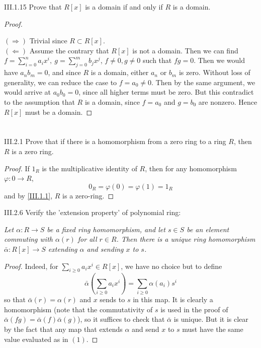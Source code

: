 \begin{problem}{III.1.15}
Prove that $R[x]$ is a domain if and only if $R$ is a domain.
\end{problem}
\begin{proof} \

\noindent $(\Rightarrow)$ Trivial since $R \subset R[x]$. \\
$(\Leftarrow)$ Assume the contrary that $R[x]$ is not a domain. Then we can find $f = \sum_{i=0}^n a_ix^i, \: g = \sum_{j=0}^m b_jx^j$, $f \neq 0, g \neq 0$ such that $fg = 0$. Then we would have $a_nb_m = 0$, and since $R$ is a domain, either $a_n$ or $b_m$ is zero. Without loss of generality, we can reduce the case to $f = a_0 \neq 0$. Then by the same argument, we would arrive at $a_0b_0 = 0$, since all higher terms must be zero. But this contradict to the assumption that $R$ is a domain, since $f = a_0$ and $g = b_0$ are nonzero. Hence $R[x]$ must be a domain.
\end{proof}

\section{}
\begin{problem}{III.2.1}
Prove that if there is a homomorphism from a zero ring to a ring $R$, then $R$ is a zero ring.
\end{problem}
\begin{proof}
If $1_R$ is the multiplicative identity of $R$, then for any homomorphism $\varphi : 0 \to R$, 
\[
0_R = \varphi(0) = \varphi(1) = 1_R
\]
and by \ref{III.1.1}, $R$ is a zero-ring.
\end{proof}

\begin{problem}{III.2.6}
Verify the 'extension property' of polynomial ring:

\textit{
Let $\alpha : R \to S$ be a fixed ring homomorphism, and let $s \in S$ be an element commuting with $\alpha(r)$ for all $r \in R$. Then there is a unique ring homomorphism $\bar{\alpha} : R[x] \to S$ extending $\alpha$ and sending $x$ to $s$.
}
\end{problem}
\begin{proof}
Indeed, for $\sum_{i \geq 0} a_ix^i \in R[x]$, we have no choice but to define
\[
\bar{\alpha}\left(\sum_{i \geq 0} a_ix^i\right) = \sum_{i \geq 0}\alpha(a_i)s^{i}  \tag{1}
\]
so that $\bar{\alpha}(r) = \alpha(r)$ and $x$ sends to $s$ in this map. It is clearly a homomorphism (note that the commutativity of $s$ is used in the proof of $\bar{\alpha}(fg) = \bar{\alpha}(f)\bar{\alpha}(g)$), so it suffices to check that $\bar{\alpha}$ is unique. But it is clear by the fact that any map that extends $\alpha$ and send $x$ to $s$ must have the same value evaluated as in $(1)$.
\end{proof}

